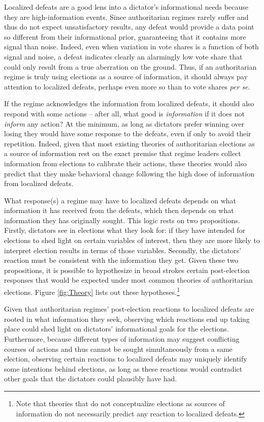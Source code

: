 \documentclass[12pt]{article}
\newcommand{\1}{\mathbbm{1}}
\begin{document}
Localized defeats are a good lens into a dictator's informational needs because they are high-information events. Since authoritarian regimes rarely suffer and thus do not expect unsatisfactory results, any defeat would provide a data point so different from their informational prior, guaranteeing that it contains more signal than noise. Indeed, even when variation in vote shares is a function of both signal and noise, a defeat indicates clearly an alarmingly low vote share that could only result from a true aberration on the ground. Thus, if an authoritarian regime is truly using elections as a source of information, it should always pay attention to localized defeats, perhaps even more so than to vote shares \textit{per se}. 

If the regime acknowledges the information from localized defeats, it should also respond with some actions -- after all, what good is \textit{information} if it does not \textit{inform} any action? At the minimum, as long as dictators prefer winning over losing they would have some response to the defeats, even if only to avoid their repetition. Indeed, given that most existing theories of authoritarian elections as a source of information rest on the exact premise that regime leaders collect information from elections to calibrate their actions, these theories would also predict that they make behavioral change following the high dose of information from localized defeats. 

What response(s) a regime may have to localized defeats depends on what information it has received from the defeats, which then depends on what information they has originally sought. This logic rests on two propositions. Firstly, dictators see in elections what they look for: if they have intended for elections to shed light on certain variables of interest, then they are more likely to interpret election results in terms of those variables. Secondly, the dictators' reaction must be consistent with the information they get. Given these two propositions, it is possible to hypothesize in broad strokes certain post-election responses that would be expected under most common theories of authoritarian elections. Figure \ref{fig:Theory} lists out these hypotheses.\footnote{Note that theories that do not conceptualize elections as sources of information \citep[e.g][]{AR2005, Cox2009} do not necessarily predict any reaction to localized defeats.}

Given that authoritarian regimes' post-election reactions to localized defeats are rooted in what information they seek, observing which reactions end up taking place could shed light on dictators' informational goals for the elections. Furthermore, because different types of information may suggest conflicting courses of actions and thus cannot be sought simultaneously from a same election, observing certain reactions to localized defeats may uniquely identify some intentions behind elections, as long as these reactions would contradict other goals that the dictators could plausibly have had.
\end{document}
